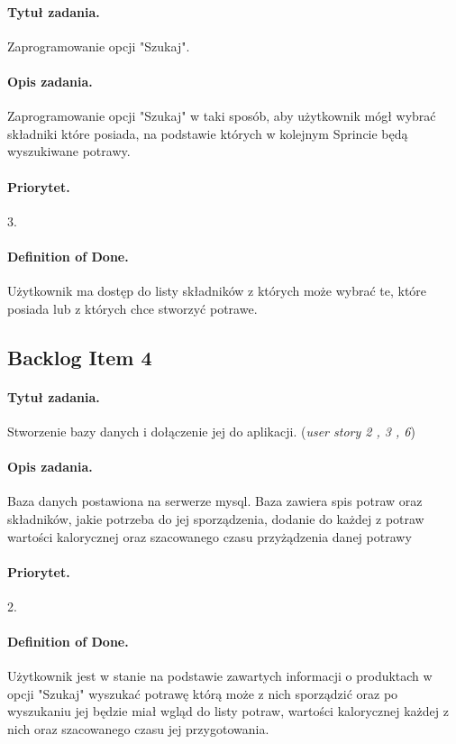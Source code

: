 \documentclass[a4paper]{article}
\begin{document}
\paragraph{Tytuł zadania.} Zaprogramowanie opcji "Szukaj".
\paragraph{Opis zadania.} Zaprogramowanie opcji "Szukaj" w taki sposób, aby użytkownik mógł wybrać składniki które posiada, na podstawie których w kolejnym Sprincie będą wyszukiwane potrawy.
\paragraph{Priorytet.} 3.
\paragraph{Definition of Done.} Użytkownik ma dostęp do listy składników z których może wybrać te, które posiada lub z których chce stworzyć potrawe.

\subsection{Backlog Item 4}
\paragraph{Tytuł zadania.} Stworzenie bazy danych i dołączenie jej do aplikacji. (\textit{user story 2 , 3 , 6})
\paragraph{Opis zadania.} Baza danych postawiona na serwerze mysql. Baza zawiera spis potraw oraz składników, jakie potrzeba do jej sporządzenia, dodanie do każdej z potraw wartości kalorycznej oraz szacowanego czasu przyżądzenia danej potrawy
\paragraph{Priorytet.} 2.
\paragraph{Definition of Done.} Użytkownik jest w stanie na podstawie zawartych informacji o produktach w opcji "Szukaj" wyszukać potrawę którą może z nich sporządzić oraz po wyszukaniu jej będzie miał wgląd do listy potraw, wartości kalorycznej każdej z nich oraz szacowanego czasu jej przygotowania.
\end{document}

